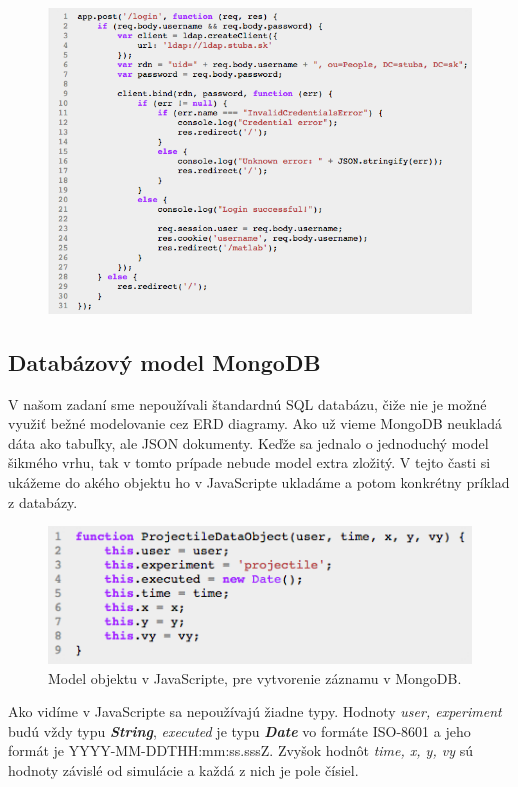 \begin{figure}[H]
  \centering
  \includegraphics[scale=0.7]{img/code/ldap-login.png}
\end{figure}

\subsection{Databázový model MongoDB}
V našom zadaní sme nepoužívali štandardnú SQL databázu, čiže nie je možné využiť bežné modelovanie cez ERD diagramy. Ako už vieme MongoDB neukladá dáta ako tabuľky, ale JSON dokumenty. Keďže sa jednalo o jednoduchý model šikmého vrhu, tak v tomto prípade nebude model extra zložitý. V tejto časti si ukážeme do akého objektu ho v JavaScripte ukladáme a potom konkrétny príklad z databázy.

\begin{figure}[H]
  \centering
  \includegraphics[scale=0.7]{img/code/javascript-projectile-model.png}
  \caption{Model objektu v JavaScripte, pre vytvorenie záznamu v MongoDB.}
  \label{img-js-projectile-model}
\end{figure}

Ako vidíme v JavaScripte sa nepoužívajú žiadne typy. Hodnoty \textit{user, experiment} budú vždy typu \textbf{\textit{String}}, \textit{executed} je typu \textbf{\textit{Date}} vo formáte ISO-8601 a jeho formát je YYYY-MM-DDTHH:mm:ss.sssZ. Zvyšok hodnôt \textit{time, x, y, vy} sú hodnoty závislé od simulácie a každá z nich je pole čísiel.

